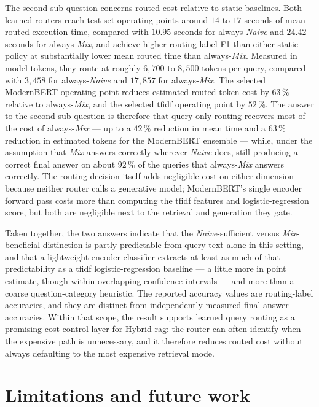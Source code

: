 \documentclass[english, bibtex]{kththesis}               %
\numberwithin{listing}{chapter}
\begin{document}
The second sub-question concerns routed cost relative to static baselines. Both learned routers reach test-set operating points around $14$ to $17$ seconds of mean routed execution time, compared with $10.95$ seconds for always-\emph{Naive} and $24.42$ seconds for always-\emph{Mix}, and achieve higher routing-label F1 than either static policy at substantially lower mean routed time than always-\emph{Mix}. Measured in model tokens, they route at roughly $6{,}700$ to $8{,}500$ tokens per query, compared with $3{,}458$ for always-\emph{Naive} and $17{,}857$ for always-\emph{Mix}. The selected ModernBERT operating point reduces estimated routed token cost by $63\,\%$ relative to always-\emph{Mix}, and the selected \gls{tfidf} operating point by $52\,\%$. The answer to the second sub-question is therefore that query-only routing recovers most of the cost of always-\emph{Mix} --- up to a $42\,\%$ reduction in mean time and a $63\,\%$ reduction in estimated tokens for the ModernBERT ensemble --- while, under the assumption that \emph{Mix} answers correctly wherever \emph{Naive} does, still producing a correct final answer on about $92\,\%$ of the queries that always-\emph{Mix} answers correctly. The routing decision itself adds negligible cost on either dimension because neither router calls a generative model; ModernBERT's single encoder forward pass costs more than computing the \gls{tfidf} features and logistic-regression score, but both are negligible next to the retrieval and generation they gate.

Taken together, the two answers indicate that the \emph{Naive}-sufficient versus \emph{Mix}-beneficial distinction is partly predictable from query text alone in this setting, and that a lightweight encoder classifier extracts at least as much of that predictability as a \gls{tfidf} logistic-regression baseline --- a little more in point estimate, though within overlapping confidence intervals --- and more than a coarse question-category heuristic. The reported accuracy values are routing-label accuracies, and they are distinct from independently measured final answer accuracies. Within that scope, the result supports learned query routing as a promising cost-control layer for Hybrid \gls{rag}: the router can often identify when the expensive path is unnecessary, and it therefore reduces routed cost without always defaulting to the most expensive retrieval mode.

\section{Limitations and future work}
\label{sec:limitationsFutureWork}
\end{document}
